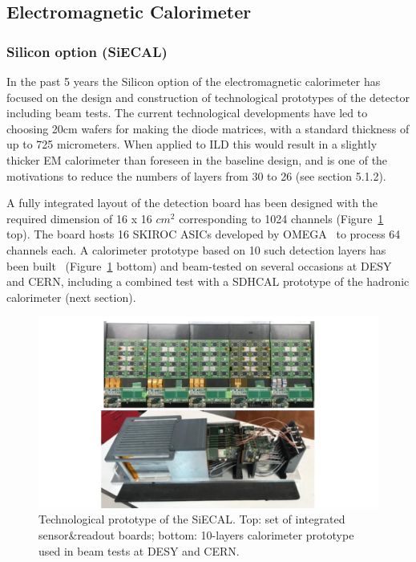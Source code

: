 \subsection{Electromagnetic Calorimeter}

\subsubsection{Silicon option (SiECAL)}

In the past 5 years the Silicon option of the electromagnetic calorimeter has focused on the design and construction of technological prototypes of the detector including beam tests. The current technological developments have led to choosing 20cm wafers for making the diode matrices, with a standard thickness of up to 725 micrometers. When applied to ILD this would result in a slightly thicker EM calorimeter than foreseen in the baseline design, and is one of the motivations to reduce the numbers of layers from 30 to 26 (see section 5.1.2).

A fully integrated layout of the detection board has been designed with the required dimension of 16 x 16 $cm^2$ corresponding to 1024 channels (Figure~\ref{fig:det:SiWECAL_proto} top). The board hosts 16 SKIROC ASICs developed by OMEGA~\cite{Callier:2011zz,Suehara:2018mqk} to process 64 channels each. A calorimeter prototype based on 10 such detection layers has been built~\cite{Boudry:2014bxa,Poeschl:2015jma} (Figure~\ref{fig:det:SiWECAL_proto} bottom) and beam-tested on several occasions at DESY and CERN, including a combined test with a SDHCAL prototype of the hadronic calorimeter (next section).   
\begin{figure}[t!]
\centering
\includegraphics[width=1.0\hsize]{Detector/fig/SiWECAL_proto.jpg}
\caption{Technological prototype of the SiECAL. Top: set of integrated sensor\&readout boards; bottom: 10-layers calorimeter prototype used in beam tests at DESY and CERN.}
\label{fig:det:SiWECAL_proto}
\end{figure}

